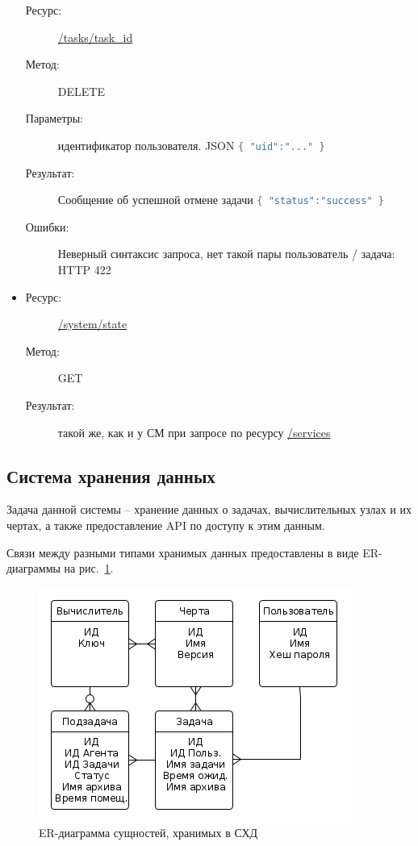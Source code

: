 \documentclass[a4paper,12pt]{report}
\numberwithin{equation}{section}
\begin{document}
\begin{itemize}
\begin{description}
      \item[Ресурс:] \url{/tasks/task_id}
      \item[Метод:] DELETE
      \item[Параметры:] идентификатор пользователя. JSON 
      \lstinline[language=Java]|{ "uid":"..." }|
      \item[Результат:] Сообщение об успешной отмене задачи
      \lstinline[language=Java]|{ "status":"success" }|
      \item[Ошибки:] Неверный синтаксис запроса, нет такой пары пользователь / задача: HTTP 422
    \end{description}
    \item
    \begin{description}
      \item[Ресурс:] \url{/system/state}
      \item[Метод:] GET
      \item[Результат:] такой же, как и у СМ при запросе по ресурсу \url{/services}
    \end{description}
  \end{itemize}
  
  \subsection{Система хранения данных}
  Задача данной системы -- хранение данных о задачах, вычислительных узлах и их чертах, а также предоставление API по доступу к этим данным.
  
  Связи между разными типами хранимых данных предоставлены в виде ER-диаграммы на рис.~\ref{fig:db-er}.
  
  \begin{figure}[h!]
    \centering
    \includegraphics[width=.9\linewidth]{diagrams/db/er}
    \caption{ER-диаграмма сущностей, хранимых в СХД}
    \label{fig:db-er}
  \end{figure}
  
\end{document}
